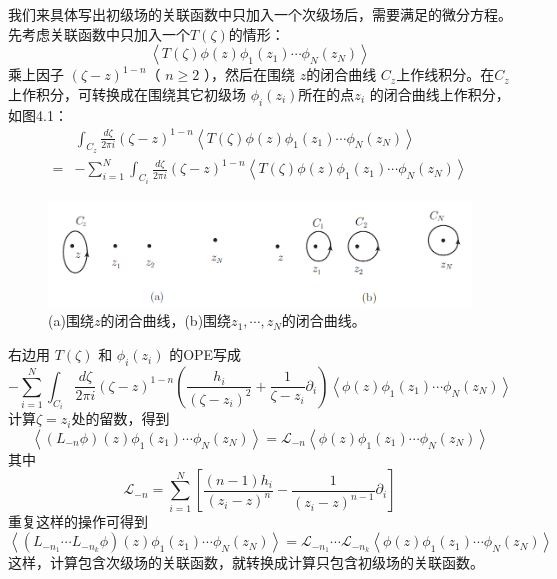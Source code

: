 我们来具体写出初级场的关联函数中只加入一个次级场后，需要满足的微分方程。先考虑关联函数中只加入一个$ T(\zeta) $的情形：
$$
\left\langle T(\zeta) \phi(z) \phi_{1}\left(z_{1}\right) \cdots \phi_{N}\left(z_{N}\right)\right\rangle
$$
乘上因子 $(\zeta-z)^{1-n} $（ $n\geq 2$ ），然后在围绕 $z $的闭合曲线 $C_z $上作线积分。在$ C_z $上作积分，可转换成在围绕其它初级场 $\phi_i(z_i) $所在的点$ z_i$ 的闭合曲线上作积分，如图4.1：
\begin{equation}
\begin{aligned} & \int_{C_{z}} \frac{d \zeta}{2 \pi i}(\zeta-z)^{1-n}\left\langle T(\zeta) \phi(z) \phi_{1}\left(z_{1}\right) \cdots \phi_{N}\left(z_{N}\right)\right\rangle \\ =&-\sum_{i=1}^{N} \int_{C_{i}} \frac{d \zeta}{2 \pi i}(\zeta-z)^{1-n}\left\langle T(\zeta) \phi(z) \phi_{1}\left(z_{1}\right) \cdots \phi_{N}\left(z_{N}\right)\right\rangle \end{aligned}
\end{equation}

\begin{figure}[h]
	\centering
	\includegraphics[width=0.6\linewidth]{fig/4.1.png}
	\caption{ (a)围绕$z$的闭合曲线，(b)围绕$z_1, \cdots, z_N$的闭合曲线。}
\end{figure}

右边用 $T(\zeta)$ 和 $\phi_i(z_i)$ 的OPE写成
\begin{equation}
	-\sum_{i=1}^{N} \int_{C_{i}} \frac{d \zeta}{2 \pi i}(\zeta-z)^{1-n}\left(\frac{h_{i}}{\left(\zeta-z_{i}\right)^{2}}+\frac{1}{\zeta-z_{i}} \partial_{i}\right)\left\langle\phi(z) \phi_{1}\left(z_{1}\right) \cdots \phi_{N}\left(z_{N}\right)\right\rangle
\end{equation}
计算$ \zeta=z_i $处的留数，得到
\begin{equation}
	\left\langle\left(L_{-n} \phi\right)(z) \phi_{1}\left(z_{1}\right) \cdots \phi_{N}\left(z_{N}\right)\right\rangle=\mathcal{L}_{-n}\left\langle\phi(z) \phi_{1}\left(z_{1}\right) \cdots \phi_{N}\left(z_{N}\right)\right\rangle
\end{equation}
其中
\begin{equation}
	\mathcal{L}_{-n}=\sum_{i=1}^{N}\left[\frac{(n-1) h_{i}}{\left(z_{i}-z\right)^{n}}-\frac{1}{\left(z_{i}-z\right)^{n-1}} \partial_{i}\right]
\end{equation}
重复这样的操作可得到
\begin{equation}
	\left\langle\left(L_{-n_{1}} \cdots L_{-n_{k}} \phi\right)(z) \phi_{1}\left(z_{1}\right) \cdots \phi_{N}\left(z_{N}\right)\right\rangle = \mathcal{L}_{-n_{1}} \cdots \mathcal{L}_{-n_{k}}\left\langle\phi(z) \phi_{1}\left(z_{1}\right) \cdots \phi_{N}\left(z_{N}\right)\right\rangle
\end{equation}
这样，计算包含次级场的关联函数，就转换成计算只包含初级场的关联函数。

